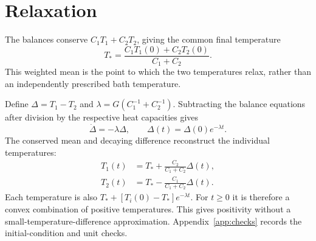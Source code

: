 \section{Relaxation}
The balances conserve $C_1T_1+C_2T_2$, giving the common final temperature
\begin{equation}
 T_* = \frac{C_1T_1(0)+C_2T_2(0)}{C_1+C_2}.\label{eq:tstar}
\end{equation}
This weighted mean is the point to which the two temperatures relax, rather than an independently prescribed bath temperature.

Define $\Delta=T_1-T_2$ and $\lambda=G(C_1^{-1}+C_2^{-1})$. Subtracting the balance equations after division by the respective heat capacities gives
\begin{equation}
 \dot\Delta=-\lambda\Delta,\qquad
 \Delta(t)=\Delta(0)e^{-\lambda t}.\label{eq:delta}
\end{equation}
The conserved mean and decaying difference reconstruct the individual temperatures:
\begin{align}
 T_1(t)&=T_*+\frac{C_2}{C_1+C_2}\Delta(t),\label{eq:t1}\\
 T_2(t)&=T_*-\frac{C_1}{C_1+C_2}\Delta(t).\label{eq:t2}
\end{align}
Each temperature is also $T_*+[T_i(0)-T_*]e^{-\lambda t}$. For $t\geq0$ it is therefore a convex combination of positive temperatures. This gives positivity without a small-temperature-difference approximation. Appendix~\ref{app:checks} records the initial-condition and unit checks.
